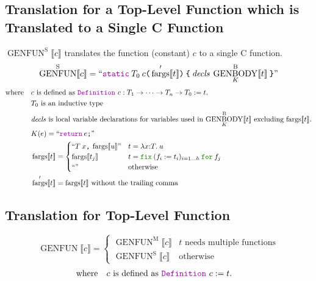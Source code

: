 \documentclass[a4paper,fleqn]{article}
\newcommand{\kwDefinition}{\mbox{\color{myviolet}\ttfamily Definition}}
\newcommand{\kwfix}{\mbox{\color{mygreen}\ttfamily fix}}
\newcommand{\kwfor}{\mbox{\color{mygreen}\ttfamily for}}
\newcommand{\lamT}[3]{\lambda #1\mathord{:}#2.\:#3}
\newcommand{\fix}[4]{\kwfix\:(#1 := #2)_{#3}\:\kwfor\:#4}
\newcommand{\BRA}[1]{\llbracket #1 \rrbracket}
\DeclareMathOperator{\genbody}{GENBODY}
\newcommand{\genbodyb}[2]{\genbody^\mathrm{B}_{#1}\BRA{#2}}
\DeclareMathOperator{\genfunop}{GENFUN}
\newcommand{\genfun}[1]{\genfunop\BRA{#1}}
\newcommand{\genfuns}[1]{\genfunop^\mathrm{S}\BRA{#1}}
\newcommand{\genfunm}[1]{\genfunop^\mathrm{M}\BRA{#1}}
\newcommand{\dq}[1]{\text{``}#1\text{''}}
\newcommand{\ttparen}[1]{\texttt{(}#1\texttt{)}}
\newcommand{\ttlbrace}{\texttt{\char '173}}
\newcommand{\ttrbrace}{\texttt{\char '175}}
\newcommand{\ttbrace}[1]{\ttlbrace#1\ttrbrace}
\newcommand{\ttsemi}{\texttt{;}}
\newcommand{\ttcomma}{\texttt{,}}
\newcommand{\kwCreturn}{\mbox{\color{myviolet}\ttfamily return}}
\newcommand{\kwstatic}{\mbox{\color{myviolet}\ttfamily static}}
\DeclareMathOperator{\fargsop}{fargs}
\newcommand{\fargs}[1]{\fargsop\BRA{#1}}
\newcommand{\fargsd}[1]{\fargsop'\BRA{#1}}
\begin{document}
\subsection{Translation for a Top-Level Function which is Translated to a Single C Function}\label{sec:genfuns}
$\genfuns{c}$ translates the function (constant) $c$ to a single C function.
\[
  \genfuns{c} = \dq{\kwstatic\:T_0\:c\ttparen{\fargsd{t}}\:\ttbrace{\:\mathit{decls}\:\genbodyb{K}{t}\:}}
\]
\[ \text{where} \quad
  \begin{aligned}[t]
    & \text{$c$ is defined as \kwDefinition~$c : T_1 \rightarrow \dotsb \rightarrow T_n \rightarrow T_0 := t.$} \\
    & \text{$T_0$ is an inductive type} \\
    & \text{$\mathit{decls}$ is local variable declarations for variables used in $\genbodyb{K}{t}$ excluding $\fargs{t}$.} \\
    & K(e) = \dq{\kwCreturn\:e\ttsemi} \\
    & \fargs{t} =
      \begin{cases}
        \dq{T\:x\ttcomma\:\fargs{u}}      & t = \lamT{x}{T}{u} \\
        \fargs{t_j}       & t = \fix{f_i}{t_i}{i=1\ldots h}{f_j} \\
        \dq{}    & \text{otherwise}
      \end{cases} \\
    & \fargsd{t} = \fargs{t}~\text{without the trailing comma}
  \end{aligned}
\]

\subsection{Translation for Top-Level Function}\label{sec:genfun}
\[
  \genfun{c} =
  \begin{cases}
    \genfunm{c} & \text{$t$ needs multiple functions} \\
    \genfuns{c} & \text{otherwise}
  \end{cases}
\]
\[ \text{where} \quad
  \begin{aligned}[t]
    & \text{$c$ is defined as \kwDefinition~$c := t.$}
  \end{aligned}
\]



\end{document}
